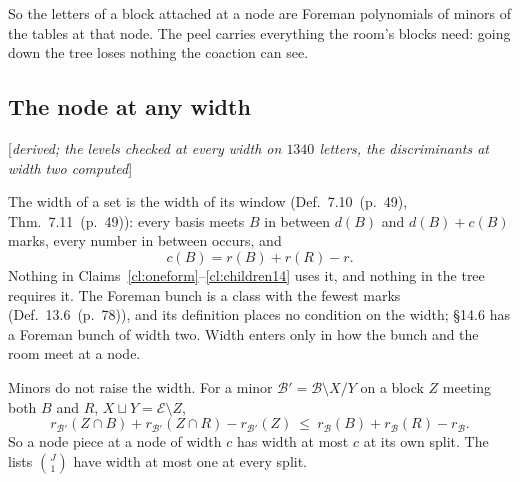 \documentclass[11pt]{article}
\newcommand{\cE}{\mathcal E}
\newcommand{\cB}{\mathcal B}
\newcommand{\status}[1]{\hfill{\small[\textit{#1}]}}
\newcommand{\hb}[2]{#1~(p.~#2)}   %
\theoremstyle{plain}
\theoremstyle{remark}
\begin{document}
So the letters of a block attached at a node are Foreman polynomials of minors of the tables at that node. The peel carries everything the room's blocks need: going down the tree loses nothing the coaction can see.

\subsection{The node at any width}\status{derived; the levels checked at every width on $1340$ letters, the discriminants at width two computed}

The width of a set is the width of its window (Def.~\hb{7.10}{49}, Thm.~\hb{7.11}{49}): every basis meets $B$ in between $d(B)$ and $d(B)+c(B)$ marks, every number in between occurs, and
\[
c(B)=r(B)+r(R)-r .
\]
Nothing in Claims~\ref{cl:oneform}--\ref{cl:children14} uses it, and nothing in the tree requires it. The Foreman bunch is a class with the fewest marks (Def.~\hb{13.6}{78}), and its definition places no condition on the width; \S14.6 has a Foreman bunch of width two. Width enters only in how the bunch and the room meet at a node.

Minors do not raise the width. For a minor $\cB'=\cB\setminus X/Y$ on a block $Z$ meeting both $B$ and $R$, $X\sqcup Y=\cE\setminus Z$,
\[
r_{\cB'}(Z\cap B)+r_{\cB'}(Z\cap R)-r_{\cB'}(Z)\ \le\ r_{\cB}(B)+r_{\cB}(R)-r_{\cB} .
\]
So a node piece at a node of width $c$ has width at most $c$ at its own split. The lists $\binom J1$ have width at most one at every split.
\end{document}
